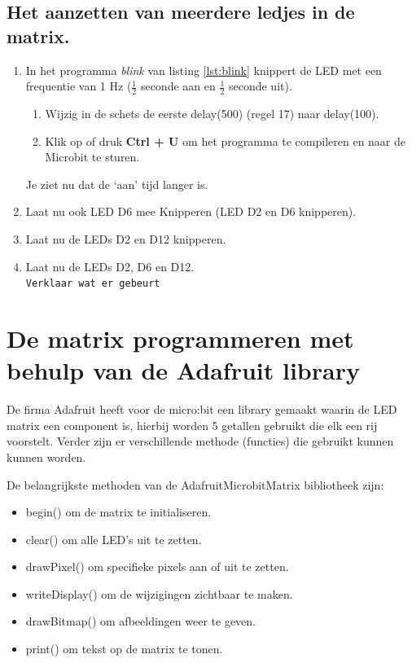 \subsection{Het aanzetten van meerdere ledjes in de matrix.}

\begin{enumerate}
	
\item In het programma \textit{blink} van listing \ref{lst:blink} knippert de LED met een frequentie van 1 Hz ($\frac{1}{2}$ seconde aan en $\frac{1}{2}$ seconde uit).\\
\begin{enumerate}
	\item Wijzig in de schets de eerste \textcolor{BurntOrange}{delay}(500) (regel 17) naar \textcolor{BurntOrange}{delay}(100).
	\item   Klik op  of druk \colorbox{mygray}{\textbf{Ctrl + U}} om het programma te compileren en naar de Microbit te sturen.
\end{enumerate}

Je ziet nu dat de ‘aan’ tijd langer is.
\item Laat nu ook LED D6 mee Knipperen (LED D2 en D6 knipperen).

\item Laat nu de LEDs D2 en D12 knipperen.

\item Laat nu de LEDs D2, D6 en D12.\\ 
\texttt{Verklaar wat er gebeurt}



\end{enumerate}

\section{De matrix programmeren met behulp van de Adafruit library}\label{sec:matrix}

De firma Adafruit heeft voor de micro:bit een library gemaakt waarin de LED matrix een component is, hierbij worden 5 getallen gebruikt die elk een rij voorstelt. Verder zijn er verschillende methode (functies) die gebruikt kunnen kunnen worden.

De belangrijkste methoden van de Adafruit\textunderscore Microbit\textunderscore Matrix bibliotheek zijn:
\begin{itemize}
	\item begin() om de matrix te initialiseren.
	\item clear() om alle LED's uit te zetten.
	\item drawPixel() om specifieke pixels aan of uit te zetten.
	\item writeDisplay() om de wijzigingen zichtbaar te maken.
	\item drawBitmap() om afbeeldingen weer te geven.
	\item print() om tekst op de matrix te tonen.
\end{itemize}

